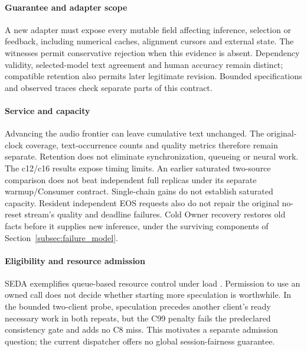 \paragraph{Guarantee and adapter scope}
A new adapter must expose every mutable field affecting inference,
selection or feedback, including numerical caches, alignment cursors and
external state. The witnesses permit conservative rejection when this
evidence is absent. Dependency validity, selected-model text agreement
and human accuracy remain distinct; compatible retention also permits
later legitimate revision. Bounded specifications and observed traces
check separate parts of this contract.

\paragraph{Service and capacity}
Advancing the audio frontier can leave cumulative text unchanged.
The original-clock coverage, text-occurrence counts and quality metrics
therefore remain separate. Retention does not eliminate synchronization,
queueing or neural work. The c12/c16 results expose timing limits. An
earlier saturated two-source comparison does not beat independent full
replicas under its separate warmup/Consumer contract. Single-chain gains
do not establish saturated capacity.
Resident independent EOS requests also do not repair the original
no-reset stream's quality and deadline failures. Cold Owner recovery
restores old facts before it supplies new inference, under the surviving
components of Section~\ref{subsec:failure_model}.

\paragraph{Eligibility and resource admission}
SEDA exemplifies queue-based resource control under load
\cite{welsh2001seda}. Permission to use an owned call does not decide whether starting more
speculation is worthwhile. In the bounded two-client probe, speculation
precedes another client's ready necessary work in both repeats, but the
C99 penalty fails the predeclared consistency gate and adds no C8 miss.
This motivates a separate admission question; the current dispatcher
offers no global session-fairness guarantee.
